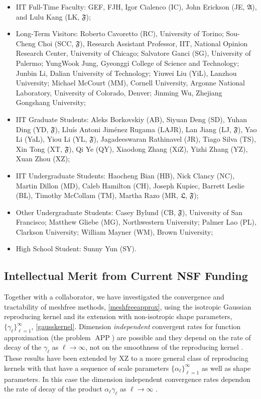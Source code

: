 \documentclass[11pt]{NSFamsart}
\DeclareMathOperator{\APP}{APP}
\newcommand{\fA}{\mathfrak{A}}
\newcommand{\fF}{\mathfrak{F}}
\newcommand{\fL}{\mathfrak{L}}
\begin{document}
\begin{itemize}[leftmargin=2.5ex]
\item IIT Full-Time Faculty: GEF, FJH, Igor Cialenco (IC), John Erickson (JE, $\fA$), and Lulu Kang (LK, $\fF$);
\item Long-Term Visitors: Roberto Cavoretto (RC), University of Torino; Sou-Cheng Choi (SCC, $\fF$), Research Assistant Professor, IIT, National Opinion Research Center, University of Chicago; Salvatore Ganci (SG), University of Palermo; YungWook Jung, Gyeonggi College of Science and Technology; Junbin Li, Dalian University of Technology; Yiuwei Liu (YiL), Lanzhou University; Michael McCourt (MM), Cornell University, Argonne National Laboratory, University of Colorado, Denver; Jinming Wu, Zhejiang Gongshang University;
\item IIT Graduate Students: Aleks Borkovskiy (AB), Siyuan Deng (SD), Yuhan Ding (YD, $\fF$), Llu\'is Antoni Jim\'enez Rugama (LAJR), Lan Jiang (LJ, $\fF$), Yao Li (YaL), Yiou Li (YL, $\fF$), Jagadeeswaran Rathinavel (JR), Tiago Silva (TS), Xin Tong (XT, $\fF$), Qi Ye (QY), Xiaodong Zhang (XiZ), Yizhi Zhang (YZ), Xuan Zhou (XZ);
\item IIT Undergraduate Students: Haocheng Bian (HB), Nick Clancy (NC), Martin Dillon (MD), Caleb Hamilton (CH), Joseph Kupiec, Barrett Leslie (BL), Timothy McCollam (TM), Martha Razo (MR, $\fL$, $\fF$);
\item Other Undergraduate Students: Casey Bylund (CB, $\fF$), University of San Francisco; Matthew Gliebe (MG), Northwestern University; Palmer Lao (PL), Clarkson University; William Mayner (WM), Brown University;
\item High School Student: Sunny Yun (SY).
\end{itemize}

\subsection{Intellectual Merit from Current NSF Funding}
\label{previousmeritsubsec}

Together with a collaborator, we have investigated the convergence and tractability of meshfree methods, \eqref{meshfreeapprox}, using the isotropic Gaussian reproducing kernel and its extension with non-isotropic shape parameters, $\{\gamma_{\ell}\}_{\ell =1}^{\infty}$, \eqref{gausskernel}. Dimension \emph{independent} convergent rates for function approximation (the problem $\APP$) are possible and they depend on the rate of decay of the $\gamma_{\ell}$ as $\ell \to \infty$, not on the smoothness of the reproducing kernel \citep{FasHicWoz12b, FasHicWoz12a}. These results have been extended by XZ to a more general class of reproducing kernels with that have a sequence of scale parameters $\{\alpha_{\ell}\}_{\ell=1}^{\infty}$ as well as shape parameters.  In this case the dimension independent convergence rates dependon the rate of decay of the product $\alpha_{\ell} \gamma_{\ell}$ as $\ell \to \infty$ \citep{ZhoHic15a}.
\end{document}
